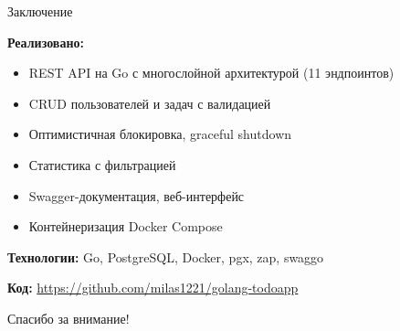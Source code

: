 \documentclass[aspectratio=169, 14pt]{beamer}
\begin{document}
\begin{frame}{Заключение}

\textbf{Реализовано:}
\begin{itemize}
  \item REST API на Go с многослойной архитектурой (11 эндпоинтов)
  \item CRUD пользователей и задач с валидацией
  \item Оптимистичная блокировка, graceful shutdown
  \item Статистика с фильтрацией
  \item Swagger-документация, веб-интерфейс
  \item Контейнеризация Docker Compose
\end{itemize}

\vspace{0.5cm}
\textbf{Технологии:} Go, PostgreSQL, Docker, pgx, zap, swaggo

\vspace{0.3cm}
\textbf{Код:} \url{https://github.com/milas1221/golang-todoapp}

\end{frame}

\begin{frame}
\centering
\vfill
{\Huge Спасибо за внимание!}
\vfill
\end{frame}
\end{document}
